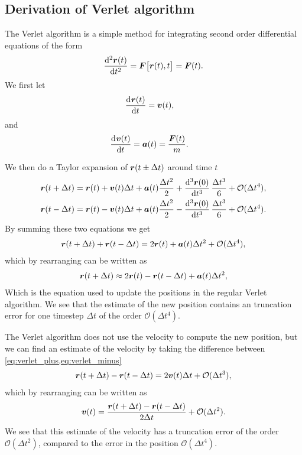 \subsection{Derivation of Verlet algorithm}
The Verlet algorithm\cite{verlet1967computer} is a simple method for integrating second order differential equations of the form 
\begin{align*}
    \dod[2]{\rvec(t)}{t} = \Fvec\big[\rvec(t), t\big] = \Fvec(t).
\end{align*}
We first let
\begin{align*}
    \dod{\rvec(t)}{t} &= \vvec(t),
\end{align*}
and
\begin{align*}
    \dod{\vvec(t)}{t} &= \avec(t) = \frac{\Fvec(t)}{m}.
\end{align*}

We then do a Taylor expansion of $\boldsymbol{r}(t \pm \Delta t)$ around time $t$
\begin{align}
    \rvec(t + \Delta t) &= \rvec(t) + \vvec(t)\Delta t + \avec(t)\frac{\Delta t^2}{2} + \dod[3]{\rvec(0)}{t}\frac{\Delta t^3}{6} + \mathcal{O}(\Delta t^4), \label{eq:verlet_plus}\\
    \rvec(t - \Delta t) &= \rvec(t) - \vvec(t)\Delta t + \avec(t)\frac{\Delta t^2}{2} - \dod[3]{\rvec(0)}{t}\frac{\Delta t^3}{6} + \mathcal{O}(\Delta t^4).\label{eq:verlet_minus}
\end{align}
By summing these two equations we get
\begin{align*}
    \boldsymbol{r}(t + \Delta t) + \boldsymbol{r}(t - \Delta t) = 2\boldsymbol{r}(t) + \boldsymbol{a}(t)\Delta t^2 + \mathcal{O}(\Delta t^4),
\end{align*}
which by rearranging can be written as
\begin{align*}
    \boldsymbol{r}(t + \Delta t) \approx 2\boldsymbol{r}(t) - \boldsymbol{r}(t - \Delta t) + \boldsymbol{a}(t)\Delta t^2,
\end{align*}
Which is the equation used to update the positions in the regular Verlet algorithm. We see that the estimate of the new position contains an truncation error for one timestep $\Delta t$ of the order $\mathcal{O}(\Delta t^4)$.

The Verlet algorithm does not use the velocity to compute the new position, but we can find an estimate of the velocity by taking the difference between \cref{eq:verlet_plus,eq:verlet_minus}
\begin{align*}
    \boldsymbol{r}(t + \Delta t) - \boldsymbol{r}(t - \Delta t) = 2\boldsymbol{v}(t)\Delta t + \mathcal{O}(\Delta t^3),
\end{align*}
which by rearranging can be written as
\begin{align*}
    \boldsymbol{v}(t) = \frac{\boldsymbol{r}(t + \Delta t) - \boldsymbol{r}(t - \Delta t)}{2\Delta t} + \mathcal{O}(\Delta t^2).
\end{align*}
We see that this estimate of the velocity has a truncation error of the order $\mathcal{O}(\Delta t^2)$, compared to the error in the position $\mathcal{O}(\Delta t^4)$.


